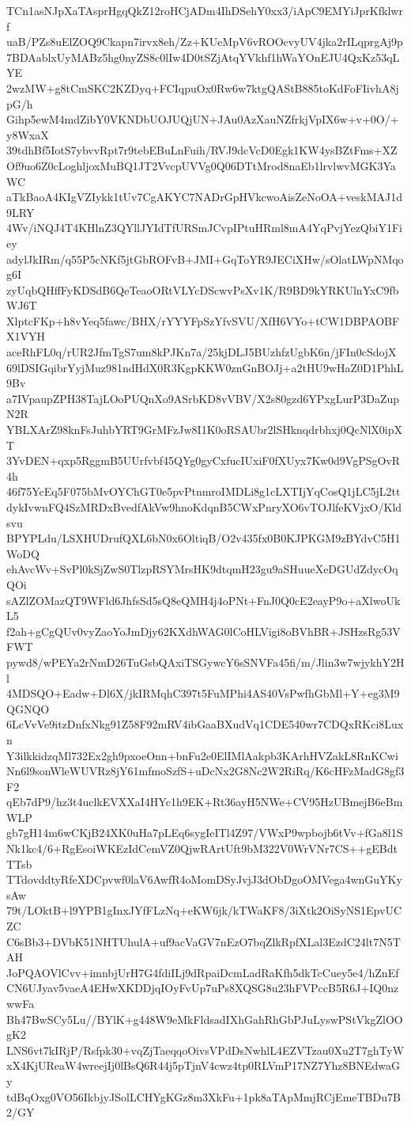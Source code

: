 TCn1asNJpXaTAsprHgqQkZ12roHCjADm4IhDSehY0xx3/iApC9EMYiJprKfklwrf
uaB/PZs8uElZOQ9Ckapn7irvx8eh/Zz+KUeMpV6vROOcvyUV4jka2rILqprgAj9p
7BDAablxUyMABz5hg0nyZS8c0lIw4D0tSZjAtqYVkhf1hWaYOnEJU4QxKz53qLYE
2wzMW+g8tCmSKC2KZDyq+FCIqpuOx0Rw6w7ktgQAStB885toKdFoFIivhA8jpG/h
Gihp5ewM4mdZibY0VKNDbUOJUQjUN+JAu0AzXauNZfrkjVpIX6w+v+0O/+y8WxaX
39tdhBf5IotS7ybvvRpt7r9tebEBuLnFuih/RVJ9dcVcD0Egk1KW4ysBZtFms+XZ
Of9uo6Z0cLoghljoxMuBQ1JT2VvcpUVVg0Q06DTtMrod8naEb1lrvlwvMGK3YaWC
aTkBaoA4KIgVZIykk1tUv7CgAKYC7NADrGpHVkcwoAisZeNoOA+veskMAJ1d9LRY
4Wv/iNQJ4T4KHlnZ3QYllJYIdTfURSmJCvpIPtuHRml8mA4YqPvjYezQbiY1Fiey
adylJkIRm/q55P5cNKf5jtGbROFvB+JMI+GqToYR9JECiXHw/sOlatLWpNMqog6I
zyUqbQHffFyKDSdB6QeTeaoORtVLYcDScwvPsXv1K/R9BD9kYRKUlnYxC9fbWJ6T
XlptcFKp+h8vYeq5fawc/BHX/rYYYFpSzYfvSVU/XfH6VYo+tCW1DBPAOBFX1VYH
aceRhFL0q/rUR2JfmTgS7um8kPJKn7a/25kjDLJ5BUzhfzUgbK6n/jFIn0cSdojX
69lDSIGqibrYyjMuz981ndHdX0R3KgpKKW0znGnBOJj+a2tHU9wHaZ0D1PhhL9Bv
a7IVpaupZPH38TajLOoPUQnXo9ASrbKD8vVBV/X2s80gzd6YPxgLurP3DaZupN2R
YBLXArZ98knFsJuhbYRT9GrMFzJw8I1K0oRSAUbr2lSHknqdrbhxj0QcNlX0ipXT
3YvDEN+qxp5RggmB5UUrfvbf45QYg0gyCxfucIUxiF0fXUyx7Kw0d9VgPSgOvR4h
46f75YcEq5F075bMvOYChGT0e5pvPtnmroIMDLi8g1cLXTIjYqCosQ1jLC5jL2tt
dykIvwnFQ4SzMRDxBvedfAkVw9hnoKdqnB5CWxPnryXO6vTOJlfeKVjxO/Kldsvu
BPYPLdu/LSXHUDrufQXL6bN0x6OltiqB/O2v435fx0B0KJPKGM9zBYdvC5H1WoDQ
ehAvcWv+SvPl0kSjZwS0TlzpRSYMrsHK9dtqmH23gu9aSHuueXeDGUdZdycOqQOi
sAZlZOMazQT9WFld6JhfsSd5sQ8eQMH4j4oPNt+FnJ0Q0cE2eayP9o+aXlwoUkL5
f2ah+gCgQUv0vyZaoYoJmDjy62KXdhWAG0lCoHLVigi8oBVhBR+JSHzsRg53VFWT
pywd8/wPEYa2rNmD26TuGsbQAxiTSGywcY6sSNVFa45fi/m/Jlin3w7wjykhY2Hl
4MDSQO+Eadw+Dl6X/jkIRMqhC397t5FuMPhi4AS40VsPwfhGbMl+Y+eg3M9QGNQO
6LcVvVe9itzDnfxNkg91Z58F92mRV4ibGaaBXudVq1CDE540wr7CDQxRKci8Luxn
Y3ilkkidzqMl732Ex2gh9pxoeOnn+bnFu2e0ElIMlAakpb3KArhHVZakL8RnKCwi
Nn6l9sonWleWUVRz8jY61mfmoSzfS+uDcNx2G8Nc2W2RiRq/K6cHFzMadG8gf3F2
qEb7dP9/hz3t4uclkEVXXaI4HYc1h9EK+Rt36ayH5NWe+CV95HzUBmejB6eBmWLP
gb7gH14m6wCKjB24XK0uHa7pLEq6sygIeITl4Z97/VWxP9wpbojb6tVv+fGa8l1S
Nk1kc4/6+RgEsoiWKEzIdCemVZ0QjwRArtUft9bM322V0WrVNr7CS++gEBdtTTsb
TTdovddtyRfeXDCpvwf0laV6AwfR4oMomDSyJvjJ3dObDgoOMVega4wnGuYKysAw
79t/LOktB+l9YPB1gInxJYfFLzNq+eKW6jk/kTWaKF8/3iXtk2OiSyNS1EpvUCZC
C6sBb3+DVbK51NHTUhulA+uf9acVaGV7nEzO7bqZlkRpfXLal3EzdC24lt7N5TAH
JoPQAOVlCvv+imnbjUrH7G4fdiILj9dRpaiDcmLadRaKfh5dkTcCuey5e4/hZnEf
CN6UJyav5vaeA4EHwXKDDjqIOyFvUp7uPs8XQSG8u23hFVPccB5R6J+IQ0nzwwFa
Bh47BwSCy5Lu//BYlK+g448W9eMkFldsadIXhGahRhGbPJuLyswPStVkgZlOOgK2
LNS6vt7kIRjP/Rsfpk30+vqZjTaeqqoOivsVPdDsNwhlL4EZVTzau0Xu2T7ghTyW
xX4KjUReaW4wreejIj0lBsQ6R44j5pTjnV4cwz4tp0RLVmP17NZ7Yhz8BNEdwaGy
tdBqOxg0VO56IkbjyJSolLCHYgKGz8m3XkFu+1pk8aTApMmjRCjEmeTBDu7B2/GY

